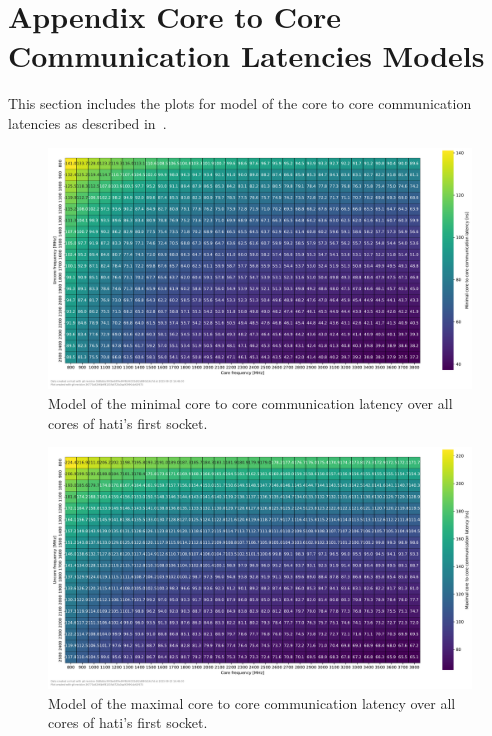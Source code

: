 \chapter{Appendix Core to Core Communication Latencies Models}
\label{app:core_to_core_latencies_model}
This section includes the plots for model of the core to core communication latencies as described in~.

\begin{figure}[]
    \centering
    \includegraphics[width=\columnwidth]{fig/core-to-core-latency/all-to-all-heatmap-model-min.pdf}
    \caption{Model of the minimal core to core communication latency over all cores of hati's first socket.}
\end{figure}

\begin{figure}[]
    \centering
    \includegraphics[width=\columnwidth]{fig/core-to-core-latency/all-to-all-heatmap-model-max.pdf}
    \caption{Model of the maximal core to core communication latency over all cores of hati's first socket.}
\end{figure}

